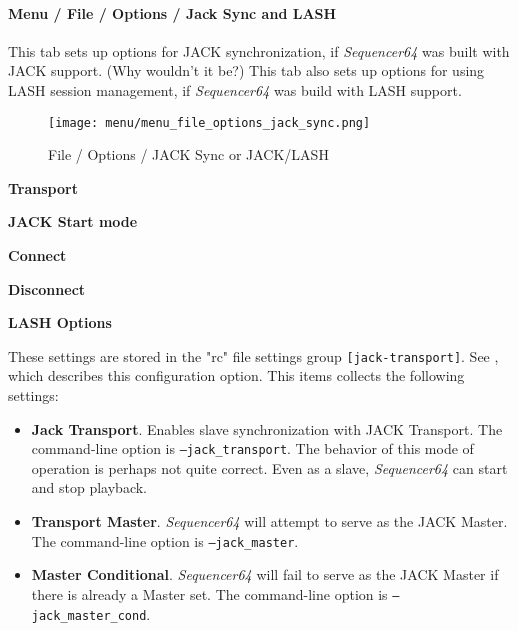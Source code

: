 \paragraph{Menu / File / Options / Jack Sync and LASH}
\label{paragraph:seq64_menu_file_options_jack_sync}

   This tab sets up options for JACK synchronization, if \textsl{Sequencer64}
   was built with JACK support.  (Why wouldn't it be?)
   This tab also sets up options for using LASH session management, if
   \textsl{Sequencer64} was build with LASH support.

\begin{figure}[H]
   \centering 
   \texttt{[image: menu/menu\_file\_options\_jack\_sync.png]}
   \caption{File / Options / JACK Sync or JACK/LASH}
   \label{fig:seq64_menu_file_options_jack_sync}
\end{figure}

   \begin{enumber}
      \item \textbf{Transport}
      \item \textbf{JACK Start mode}
      \item \textbf{Connect}
      \item \textbf{Disconnect}
      \item \textbf{LASH Options}
   \end{enumber}

   \setcounter{ItemCounter}{0}      %

   These settings are stored in the "rc" file settings group
   \texttt{[jack-transport]}.
   See ,
   which describes this configuration option.
   This items collects the following settings:

   \begin{itemize}
      \item \textbf{Jack Transport}.
         Enables slave synchronization with JACK Transport.
         The command-line option is \texttt{--jack\_transport}.
         The behavior of this mode of operation is perhaps not quite
         correct.  Even as a slave, \textsl{Sequencer64} can start and
         stop playback.
      \item \textbf{Transport Master}.
         \textsl{Sequencer64} will attempt to serve as the JACK Master.
         The command-line option is \texttt{--jack\_master}.
      \item \textbf{Master Conditional}.
         \textsl{Sequencer64} will fail to serve as the JACK Master if there is
         already a Master set.
         The command-line option is \texttt{--jack\_master\_cond}.
   \end{itemize}

